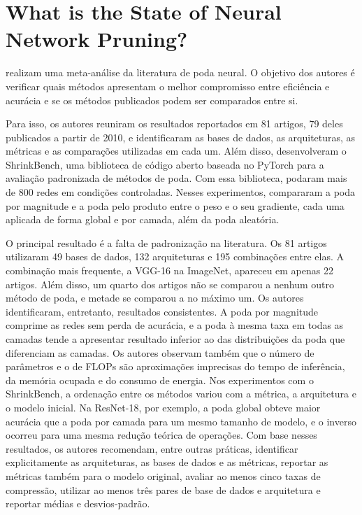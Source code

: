\section{What is the State of Neural Network Pruning?}\label{sec:blalock2020}

 realizam uma meta-análise da literatura de poda neural. O objetivo dos
autores é verificar quais métodos apresentam o melhor compromisso entre eficiência e acurácia e
se os métodos publicados podem ser comparados entre si.

Para isso, os autores reuniram os resultados reportados em 81 artigos, 79 deles publicados a
partir de 2010, e identificaram as bases de dados, as arquiteturas, as métricas e as comparações
utilizadas em cada um. Além disso, desenvolveram o ShrinkBench, uma biblioteca de código aberto
baseada no PyTorch para a avaliação padronizada de métodos de poda. Com essa biblioteca,
podaram mais de 800 redes em condições controladas. Nesses experimentos, compararam a poda por
magnitude e a poda pelo produto entre o peso e o seu gradiente, cada uma aplicada de forma global
e por camada, além da poda aleatória.

O principal resultado é a falta de padronização na literatura. Os 81 artigos utilizaram 49
bases de dados, 132 arquiteturas e 195 combinações entre elas. A combinação mais frequente, a
VGG-16 na ImageNet, apareceu em apenas 22 artigos. Além disso, um quarto dos artigos não se
comparou a nenhum outro método de poda, e metade se comparou a no máximo um. Os autores
identificaram, entretanto, resultados consistentes. A poda por magnitude comprime as redes sem
perda de acurácia, e a poda à mesma taxa em todas as camadas tende a apresentar resultado
inferior ao das distribuições da poda que diferenciam as camadas. Os autores observam também que
o número de parâmetros e o de FLOPs são aproximações imprecisas do tempo de inferência, da
memória ocupada e do consumo de energia. Nos experimentos com o ShrinkBench, a ordenação entre os
métodos variou com a métrica, a arquitetura e o modelo inicial. Na ResNet-18, por exemplo, a
poda global obteve maior acurácia que a poda por camada para um mesmo tamanho de modelo, e o
inverso ocorreu para uma mesma redução teórica de operações. Com base nesses resultados, os
autores recomendam, entre outras práticas, identificar explicitamente as arquiteturas, as bases
de dados e as métricas, reportar as métricas também para o modelo original, avaliar ao menos
cinco taxas de compressão, utilizar ao menos três pares de base de dados e arquitetura e
reportar médias e desvios-padrão.

